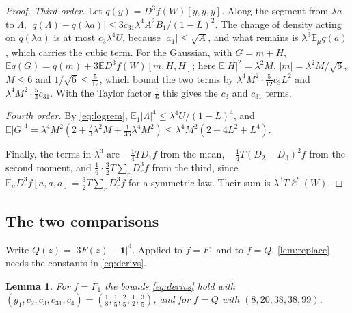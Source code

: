 \documentclass[11pt]{amsart}
\newtheorem{lemma}[theorem]{Lemma}
\theoremstyle{definition}
\theoremstyle{remark}
\newcommand{\E}{\mathbb{E}}
\newcommand{\one}{\mathbf{1}}
\begin{document}
\begin{proof}
\emph{Third order.} Let $q(y)=D^3f(W)[y,y,y]$. Along the segment from $\lambda a$ to $\Lambda$,
$|q(\Lambda)-q(\lambda a)|\le3c_{31}\lambda^4A^2B_1/(1-L)^2$. The change of density acting on $q(\lambda a)$ is at
most $c_3\lambda^4U$, because $|a_1|\le\sqrt A$, and what remains is $\lambda^3\E_\mu q(a)$, which carries the
cubic term. For the Gaussian, with $G=m+H$, $\E q(G)=q(m)+3\E D^3f(W)[m,H,H]$; here $\E|H|^2=\lambda^2M$,
$|m|=\lambda^2M/\sqrt6$, $M\le6$ and $1/\sqrt6\le\tfrac5{12}$, which bound the two terms by
$\lambda^4M^2\cdot\tfrac5{12}c_3L^2$ and $\lambda^4M^2\cdot\tfrac54c_{31}$. With the Taylor factor $\tfrac16$ this
gives the $c_3$ and $c_{31}$ terms.

\emph{Fourth order.} By \eqref{eq:logrem}, $\E_1|\Lambda|^4\le\lambda^4U/(1-L)^4$, and
$\E|G|^4=\lambda^4M^2(2+\tfrac23\lambda^2M+\tfrac1{36}\lambda^4M^2)\le\lambda^4M^2(2+4L^2+L^4)$.

Finally, the terms in $\lambda^3$ are $-\tfrac14TD_1f$ from the mean, $-\tfrac14T(D_2-D_3)^2f$ from the second
moment, and $\tfrac16\cdot\tfrac32T\sum_rD_r^3f$ from the third, since
$\E_\mu D^3f[a,a,a]=\tfrac32T\sum_rD_r^3f$ for a symmetric law. Their sum is $\lambda^3T\ell_1^f(W)$.
\end{proof}

\subsection{The two comparisons}
Write $Q(z)=|3F(z)-\one|^4$. Applied to $f=F_1$ and to $f=Q$, \cref{lem:replace} needs the constants in
\eqref{eq:derivs}.

\begin{lemma}\label{lem:softmax}
For $f=F_1$ the bounds \eqref{eq:derivs} hold with $(g_1,c_2,c_3,c_{31},c_4)=(\tfrac18,\tfrac15,\tfrac25,\tfrac12,\tfrac35)$,
and for $f=Q$ with $(8,20,38,38,99)$.
\end{lemma}
\end{document}
